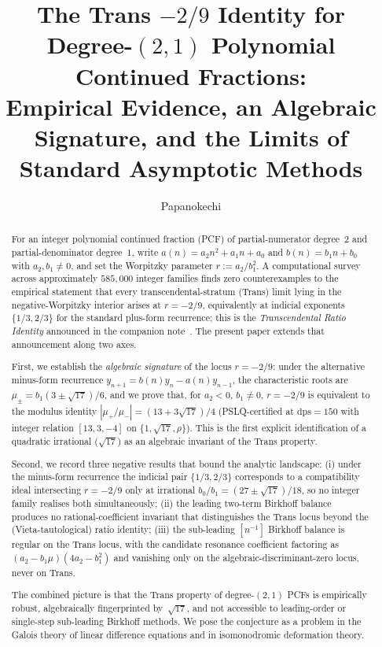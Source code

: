 \documentclass[11pt]{amsart}
\title[The Trans $-2/9$ Identity]{The Trans $-2/9$ Identity for
Degree-$(2,1)$ Polynomial Continued Fractions:\\
Empirical Evidence, an Algebraic Signature, and the Limits of
Standard Asymptotic Methods}
\author{Papanokechi}
\theoremstyle{definition}
\theoremstyle{remark}
\newcommand{\dps}{\mathrm{dps}}
\begin{document}
\begin{abstract}
For an integer polynomial continued fraction (PCF) of partial-numerator
degree~$2$ and partial-denominator degree~$1$, write
$a(n) = a_2 n^2 + a_1 n + a_0$ and $b(n) = b_1 n + b_0$ with
$a_2,b_1\ne 0$, and set the Worpitzky parameter $r := a_2/b_1^2$.
A computational survey across approximately $585{,}000$ integer
families finds zero counterexamples to the empirical statement that
every transcendental-stratum (Trans) limit lying in the
negative-Worpitzky interior arises at $r = -2/9$, equivalently at
indicial exponents $\{1/3,2/3\}$ for the standard
plus-form recurrence; this is the
\emph{Transcendental Ratio Identity} announced in the companion
note~\cite{TRINote}.  The present paper extends that announcement
along two axes.

First, we establish the \emph{algebraic signature} of the locus
$r=-2/9$: under the alternative minus-form recurrence
$y_{n+1} = b(n)y_n - a(n)y_{n-1}$, the characteristic roots are
$\mu_\pm = b_1(3\pm\sqrt{17})/6$, and we prove that, for $a_2<0$,
$b_1\ne 0$, $r=-2/9$ is equivalent to the modulus identity
$|\mu_+/\mu_-| = (13+3\sqrt{17})/4$ (PSLQ-certified at $\dps=150$
with integer relation $[13,3,-4]$ on $\{1,\sqrt{17},\rho\}$).  This
is the first explicit identification of a quadratic irrational
($\sqrt{17}$) as an algebraic invariant of the Trans property.

Second, we record three negative results that bound the
analytic landscape: (i) under the minus-form recurrence the
indicial pair $\{1/3,2/3\}$ corresponds to a compatibility ideal
intersecting $r=-2/9$ only at irrational $b_0/b_1=(27\pm\sqrt{17})/18$,
so no integer family realises both simultaneously; (ii) the leading
two-term Birkhoff balance produces no rational-coefficient invariant
that distinguishes the Trans locus beyond the (Vieta-tautological)
ratio identity; (iii) the sub-leading $[n^{-1}]$ Birkhoff balance is
regular on the Trans locus, with the candidate resonance coefficient
factoring as $(a_2-b_1\mu)(4a_2-b_1^2)$ and vanishing only on the
algebraic-discriminant-zero locus, never on Trans.

The combined picture is that the Trans property of degree-$(2,1)$ PCFs
is empirically robust, algebraically fingerprinted by~$\sqrt{17}$, and
not accessible to leading-order or single-step sub-leading Birkhoff
methods.  We pose the conjecture as a problem in the Galois theory of
linear difference equations and in isomonodromic deformation theory.
\end{abstract}
\end{document}
